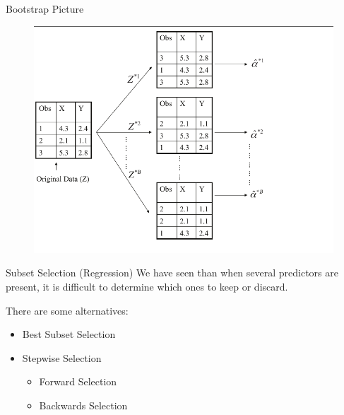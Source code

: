 \documentclass{beamer}
\begin{document}
\begin{frame}{Bootstrap Picture}

		
		\begin{figure}[h]
			\centering
			\includegraphics[scale=0.5]{../../Figures/5.11.png}
		\end{figure}
\end{frame}


\begin{frame}{Subset Selection (Regression)}
	We have seen than when several predictors are present, it is difficult to determine which ones to keep or discard. 
	
	There are some alternatives:
	\begin{itemize}
		\item Best Subset Selection
		\item Stepwise Selection
		\begin{itemize}
			\item Forward Selection
			\item Backwards Selection
		\end{itemize}
	\end{itemize}
\end{frame}
\end{document}

